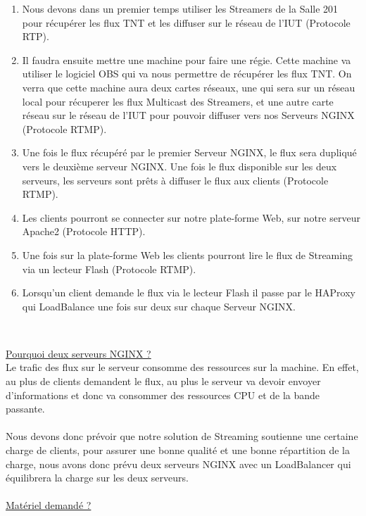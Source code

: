 \documentclass{report}
\begin{document}
    \begin{enumerate}
    \item  Nous devons dans un premier temps utiliser les Streamers de la Salle 201 pour récupérer les flux TNT et les diffuser sur le réseau de l’IUT (Protocole RTP).
    \item Il faudra ensuite mettre une machine pour faire une régie. Cette machine va utiliser le logiciel OBS qui va nous permettre de récupérer les flux TNT. On verra que cette machine aura deux cartes réseaux, une qui sera sur un réseau local pour récuperer les flux Multicast des Streamers, et une autre carte réseau sur le réseau de l'IUT pour pouvoir diffuser vers nos Serveurs NGINX (Protocole RTMP).
    \item Une fois le flux récupéré par le premier Serveur NGINX, le flux sera dupliqué vers le deuxième serveur NGINX. Une fois le flux disponible sur les deux serveurs, les serveurs sont prêts à diffuser le flux aux clients (Protocole RTMP).
    \item Les clients pourront se connecter sur notre plate-forme Web, sur notre serveur Apache2 (Protocole HTTP).
    \item Une fois sur la plate-forme Web les clients pourront lire le flux de Streaming via un lecteur Flash (Protocole RTMP).
    \item Lorsqu’un client demande le flux via le lecteur Flash il passe par le HAProxy qui LoadBalance une fois sur deux sur chaque Serveur NGINX.
    \end{enumerate}
    \\
    \hfill
    
    \underline{Pourquoi deux serveurs NGINX ?}\\
     
     
	Le trafic des flux sur le serveur consomme des ressources sur la machine. En effet, au plus de clients demandent le flux, au plus le serveur va devoir envoyer d’informations et donc va consommer des ressources CPU et de la bande passante. 
	\\
	\\
	Nous devons donc prévoir que notre solution de Streaming soutienne une certaine charge de clients, pour assurer une bonne qualité et une bonne répartition de la charge, nous avons donc prévu deux serveurs NGINX avec un LoadBalancer qui équilibrera la charge sur les deux serveurs.\\
	\\
	
	\underline{Matériel demandé ?}\\
	
\end{document}
